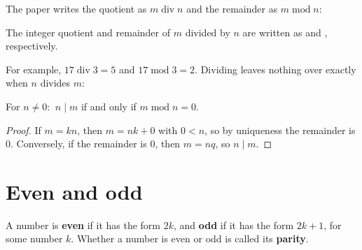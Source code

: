 The paper writes the quotient as \(m \operatorname{div} n\) and the
remainder as \(m \operatorname{mod} n\):

\bpush\begin{bquote}

The integer quotient and remainder
of \(m\) divided by \(n\) are written as
and
,
respectively.

\end{bquote}\bpop

For example, \(17 \operatorname{div} 3 = 5\) and
\(17 \operatorname{mod} 3 = 2\). Dividing leaves nothing over exactly
when \(n\) divides \(m\):

\bpush\begin{bproposition}\label{prop-dvd-mod}

For \(n \ne 0\): \(\ n \mid m\) if and only if
\(m \operatorname{mod} n = 0\).

\end{bproposition}\bpop

\bpush\begin{proof}

If \(m = kn\), then \(m = nk + 0\) with \(0 < n\), so by uniqueness the
remainder is \(0\). Conversely, if the remainder is \(0\), then
\(m = nq\), so \(n \mid m\).

\end{proof}\bpop

\hypertarget{even-and-odd}{%
\section{Even and odd}\label{even-and-odd}}

\bpush\begin{bdefinition}\label{def-parity}


A number is \textbf{even} if it has the form \(2k\), and \textbf{odd} if
it has the form \(2k + 1\), for some number \(k\). Whether a number is
even or odd is called its \textbf{parity}.

\end{bdefinition}\bpop

